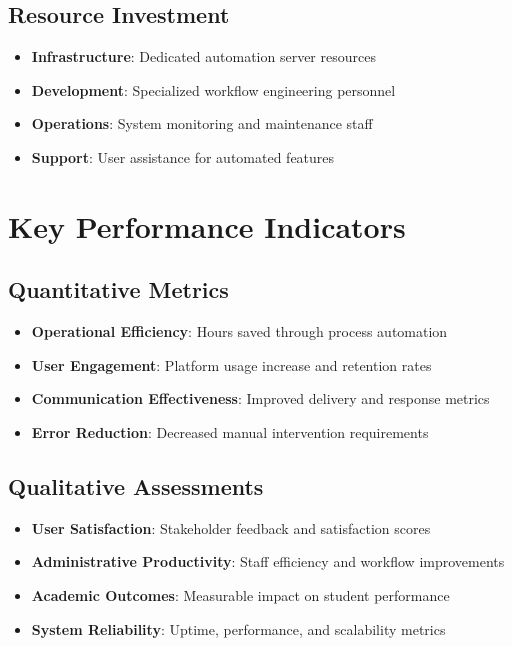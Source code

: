 \subsection{Resource Investment}

\begin{itemize}
    \item \textbf{Infrastructure}: Dedicated automation server resources
    \item \textbf{Development}: Specialized workflow engineering personnel
    \item \textbf{Operations}: System monitoring and maintenance staff
    \item \textbf{Support}: User assistance for automated features
\end{itemize}

\section{Key Performance Indicators}

\subsection{Quantitative Metrics}

\begin{itemize}
    \item \textbf{Operational Efficiency}: Hours saved through process automation
    \item \textbf{User Engagement}: Platform usage increase and retention rates
    \item \textbf{Communication Effectiveness}: Improved delivery and response metrics
    \item \textbf{Error Reduction}: Decreased manual intervention requirements
\end{itemize}

\subsection{Qualitative Assessments}

\begin{itemize}
    \item \textbf{User Satisfaction}: Stakeholder feedback and satisfaction scores
    \item \textbf{Administrative Productivity}: Staff efficiency and workflow improvements
    \item \textbf{Academic Outcomes}: Measurable impact on student performance
    \item \textbf{System Reliability}: Uptime, performance, and scalability metrics
\end{itemize}

